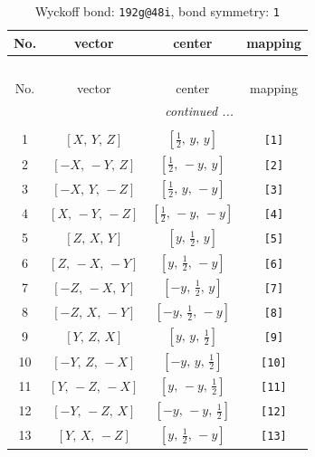 \documentclass[fleqn,8pt]{jsarticle}
\begin{document}
\begin{longtable}{cccc}
\caption{Wyckoff bond: {\tt 192g@48i}, bond symmetry: {\tt 1}}
 \\
 \hline \hline
No. & vector & center & mapping \\ \hline \endfirsthead

\multicolumn{3}{l}{\tablename\ \thetable{}} \\
 \hline \hline
No. & vector & center & mapping \\ \hline \endhead

 \hline \hline
\multicolumn{3}{r}{\footnotesize\it continued ...} \\ \endfoot

 \hline \hline
\multicolumn{3}{r}{} \\ \endlastfoot

1 & $\left[ X,\, Y,\, Z \right]$ & $\left[ \frac{1}{2},\, y,\, y \right]$ & {\tt [1]} \\ \hline
2 & $\left[ - X,\, - Y,\, Z \right]$ & $\left[ \frac{1}{2},\, - y,\, y \right]$ & {\tt [2]} \\ \hline
3 & $\left[ - X,\, Y,\, - Z \right]$ & $\left[ \frac{1}{2},\, y,\, - y \right]$ & {\tt [3]} \\ \hline
4 & $\left[ X,\, - Y,\, - Z \right]$ & $\left[ \frac{1}{2},\, - y,\, - y \right]$ & {\tt [4]} \\ \hline
5 & $\left[ Z,\, X,\, Y \right]$ & $\left[ y,\, \frac{1}{2},\, y \right]$ & {\tt [5]} \\ \hline
6 & $\left[ Z,\, - X,\, - Y \right]$ & $\left[ y,\, \frac{1}{2},\, - y \right]$ & {\tt [6]} \\ \hline
7 & $\left[ - Z,\, - X,\, Y \right]$ & $\left[ - y,\, \frac{1}{2},\, y \right]$ & {\tt [7]} \\ \hline
8 & $\left[ - Z,\, X,\, - Y \right]$ & $\left[ - y,\, \frac{1}{2},\, - y \right]$ & {\tt [8]} \\ \hline
9 & $\left[ Y,\, Z,\, X \right]$ & $\left[ y,\, y,\, \frac{1}{2} \right]$ & {\tt [9]} \\ \hline
10 & $\left[ - Y,\, Z,\, - X \right]$ & $\left[ - y,\, y,\, \frac{1}{2} \right]$ & {\tt [10]} \\ \hline
11 & $\left[ Y,\, - Z,\, - X \right]$ & $\left[ y,\, - y,\, \frac{1}{2} \right]$ & {\tt [11]} \\ \hline
12 & $\left[ - Y,\, - Z,\, X \right]$ & $\left[ - y,\, - y,\, \frac{1}{2} \right]$ & {\tt [12]} \\ \hline
13 & $\left[ Y,\, X,\, - Z \right]$ & $\left[ y,\, \frac{1}{2},\, - y \right]$ & {\tt [13]} \\ \hline

\end{longtable}
\end{document}
